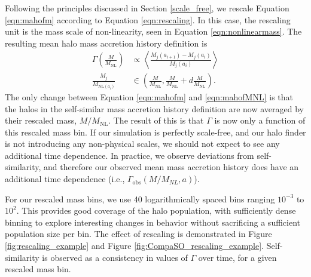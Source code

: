 Following the principles discussed in Section \ref{scale_free}, we rescale Equation \ref{eqn:mahofm} according to Equation \ref{eqn:rescaling}. In this case, the rescaling unit is the mass scale of non-linearity, seen in Equation \ref{eqn:nonlinearmass}. The resulting mean halo mass accretion history definition is
\begin{equation} \label{eqn:mahofMNL}
\begin{split}
\Gamma\left(\frac{M}{M_{\mathrm{NL}}}\right) & \propto \left<\frac{M_j(a_{i+1}) - M_j(a_{i})}{M_j(a_{i})}\right> \\
 \frac{M_j}{M_{\mathrm{NL}(a_i)}} & \in \left(\frac{M}{M_{\mathrm{NL}}}, \frac{M}{M_{\mathrm{NL}}} + d \frac{M}{M_{\mathrm{NL}}}\right).
\end{split}
\end{equation}
The only change between Equation \ref{eqn:mahofm} and \ref{eqn:mahofMNL} is that the halos in the self-similar mass accretion history definition are now averaged by their rescaled mass, $M/M_{\mathrm{NL}}$. The result of this is that $\Gamma$ is now only a function of this rescaled mass bin. If our simulation is perfectly scale-free, and our halo finder is not introducing any non-physical scales, we should not expect to see any additional time dependence. In practice, we observe deviations from self-similarity, and therefore our observed mean mass accretion history does have an additional time dependence (i.e., $\Gamma_{\mathrm{obs}}(M/M_{NL}, a)$).

For our rescaled mass bins, we use 40 logarithmically spaced bins ranging $10^{-3}$ to $10^{2}$. This provides good coverage of the halo population, with sufficiently dense binning to explore interesting changes in behavior without sacrificing a sufficient population size per bin. The effect of rescaling is demonstrated in Figure \ref{fig:rescaling_example} and Figure \ref{fig:CompaSO_rescaling_example}. Self-similarity is observed as a consistency in values of $\Gamma$ over time, for a given rescaled mass bin.

